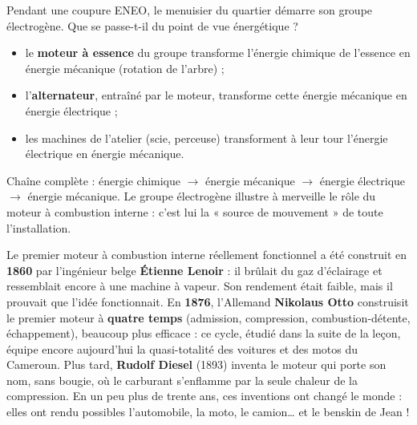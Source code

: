 \documentclass[11pt]{article}
\newcounter{popsec}
\newcounter{popsub}
\newcommand{\courssub}[1]{%
  \stepcounter{popsub}%
  \par\vspace{9pt}\noindent{\popxbold\fontsize{11.5}{13}\selectfont\color{popink}{\color{poporange}\thepopsec.\thepopsub}\hspace{6pt}#1}\par\nopagebreak\vspace{4pt}
}
\begin{document}
\begin{exemplebox}
Pendant une coupure ENEO, le menuisier du quartier démarre son groupe électrogène. Que se passe-t-il du point de vue énergétique ?
\begin{itemize}
\item le \textbf{moteur à essence} du groupe transforme l'énergie chimique de l'essence en énergie mécanique (rotation de l'arbre) ;
\item l'\textbf{alternateur}, entraîné par le moteur, transforme cette énergie mécanique en énergie électrique ;
\item les machines de l'atelier (scie, perceuse) transforment à leur tour l'énergie électrique en énergie mécanique.
\end{itemize}
Chaîne complète : énergie chimique $\rightarrow$ énergie mécanique $\rightarrow$ énergie électrique $\rightarrow$ énergie mécanique. Le groupe électrogène illustre à merveille le rôle du moteur à combustion interne : c'est lui la « source de mouvement » de toute l'installation.
\end{exemplebox}

\begin{savaistu}
Le premier moteur à combustion interne réellement fonctionnel a été construit en \textbf{1860} par l'ingénieur belge \textbf{Étienne Lenoir} : il brûlait du gaz d'éclairage et ressemblait encore à une machine à vapeur. Son rendement était faible, mais il prouvait que l'idée fonctionnait. En \textbf{1876}, l'Allemand \textbf{Nikolaus Otto} construisit le premier moteur à \textbf{quatre temps} (admission, compression, combustion-détente, échappement), beaucoup plus efficace : ce cycle, étudié dans la suite de la leçon, équipe encore aujourd'hui la quasi-totalité des voitures et des motos du Cameroun. Plus tard, \textbf{Rudolf Diesel} (1893) inventa le moteur qui porte son nom, sans bougie, où le carburant s'enflamme par la seule chaleur de la compression. En un peu plus de trente ans, ces inventions ont changé le monde : elles ont rendu possibles l'automobile, la moto, le camion\ldots{} et le benskin de Jean !
\end{savaistu}

\courssub{Exercice résolu}
\end{document}
